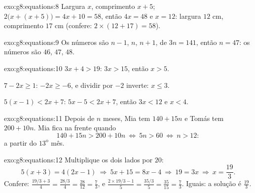 \begin{solution}{exo:g8:equations:8}
Largura $x$, comprimento $x + 5$; 
$2\bigl(x + (x + 5)\bigr) = 4x + 10 = 58$, então $4x = 48$ e $x = 12$:
largura $12$ cm, comprimento $17$ cm (confere:
$2 \times (12 + 17) = 58$).
\end{solution}

\begin{solution}{exo:g8:equations:9}
Os números são $n - 1$, $n$, $n + 1$, de  $3n = 141$, então
$n = 47$: os números são $46$, $47$, $48$.
\end{solution}

\begin{solution}{exo:g8:equations:10}
$3x + 4 > 19$: $3x > 15$, então $x > 5$.

$7 - 2x \geq 1$: $-2x \geq -6$, e dividir por $-2$ inverte:
$x \leq 3$.

$5(x-1) < 2x + 7$: $5x - 5 < 2x + 7$, então $3x < 12$ e $x < 4$.
\end{solution}

\begin{solution}{exo:g8:equations:11}
Depois de $n$ meses, Mia tem $140 + 15n$ e Tomás tem $200 + 10n$. Mia
fica na frente quando
\[
140 + 15n > 200 + 10n
\ \Longleftrightarrow\
5n > 60
\ \Longleftrightarrow\
n > 12 :
\]
a partir do $13^{\text{o}}$ mês.
\end{solution}

\begin{solution}{exo:g8:equations:12}
Multiplique os dois lados por $20$:
\[
5(x + 3) = 4(2x - 1)
\ \Longrightarrow\
5x + 15 = 8x - 4
\ \Longrightarrow\
19 = 3x
\ \Longrightarrow\
x = \frac{19}{3}.
\]
Confere: $\frac{19/3 + 3}{4} = \frac{28/3}{4} = \frac{28}{12} =
\frac73$, e $\frac{2 \times 19/3 - 1}{5} = \frac{35/3}{5} =
\frac{35}{15} = \frac73$. Iguais: a solução é $\frac{19}{3}$.
\end{solution}

